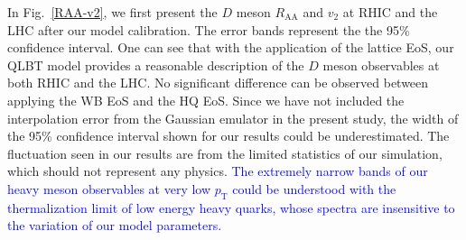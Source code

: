 \documentclass[aps,superscriptaddress,prc,twocolumn,nofootinbib]{revtex4}
\begin{document}
In Fig.~\ref{RAA-v2}, we first present the $D$ meson $R_\mathrm{AA}$ and $v_2$ at RHIC and the LHC after our model calibration. The error bands represent the the 95\% confidence interval. One can see that with the application of the lattice EoS, our QLBT model provides a reasonable description of the $D$ meson observables at both RHIC and the LHC. No significant difference can be observed between applying the WB EoS and the HQ EoS. {\color{blue} Since we have not included the interpolation error from the Gaussian emulator in the present study, the width of the 95\% confidence interval shown for our results could be underestimated. The fluctuation seen in our results are from the limited statistics of our simulation, which should not represent any physics.}
 \textcolor{blue}{The extremely narrow bands of our heavy meson observables at very low $p_\mathrm{T}$ could be understood with the thermalization limit of low energy heavy quarks, whose spectra are insensitive to the variation of our model parameters.}
\end{document}
